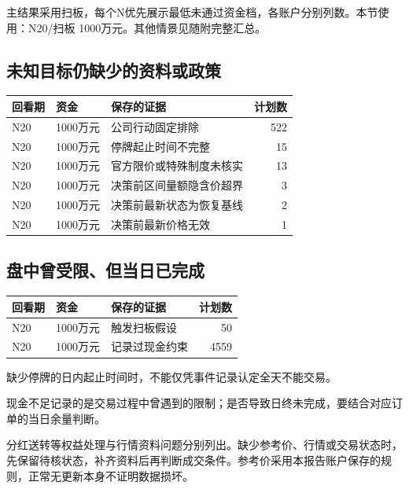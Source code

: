 \documentclass[UTF8,10pt,a4paper,fontset=fandol]{ctexart}
\begin{document}
主结果采用扫板，每个N优先展示最低未通过资金档，各账户分别列数。本节使用：N20/扫板 1000万元。其他情景见随附完整汇总。\subsection*{未知目标仍缺少的资料或政策}\begin{table}[H]\centering\small\begin{tabular}{lllr}\toprule 回看期 & 资金 & 保存的证据 & 计划数\\\midrule N20 & 1000万元 & 公司行动固定排除 & 522 \\
N20 & 1000万元 & 停牌起止时间不完整 & 15 \\
N20 & 1000万元 & 官方限价或特殊制度未核实 & 13 \\
N20 & 1000万元 & 决策前区间量额隐含价超界 & 3 \\
N20 & 1000万元 & 决策前最新状态为恢复基线 & 2 \\
N20 & 1000万元 & 决策前最新价格无效 & 1 \\\bottomrule\end{tabular}\end{table}\subsection*{盘中曾受限、但当日已完成}\begin{table}[H]\centering\small\begin{tabular}{lllr}\toprule 回看期 & 资金 & 保存的证据 & 计划数\\\midrule N20 & 1000万元 & 触发扫板假设 & 50 \\
N20 & 1000万元 & 记录过现金约束 & 4559 \\\bottomrule\end{tabular}\end{table}

缺少停牌的日内起止时间时，不能仅凭事件记录认定全天不能交易。

现金不足记录的是交易过程中曾遇到的限制；是否导致日终未完成，要结合对应订单的当日余量判断。

分红送转等权益处理与行情资料问题分别列出。缺少参考价、行情或交易状态时，先保留待核状态，补齐资料后再判断成交条件。参考价采用本报告账户保存的规则，正常无更新本身不证明数据损坏。
\end{document}

